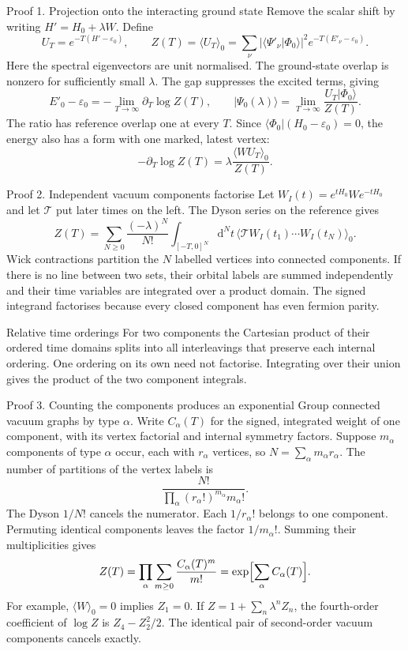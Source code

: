 \documentclass[aspectratio=169,10pt]{beamer}
\newcommand{\ket}[1]{\vert #1\rangle}
\newcommand{\bra}[1]{\langle #1\vert}
\newcommand{\braket}[2]{\langle #1\vert #2\rangle}
\newcommand{\dd}{\mathrm{d}}
\newcommand{\av}[1]{\langle #1\rangle_0}
\newcommand{\ph}{\Phi_0}
\begin{document}
\begin{frame}{Proof 1. Projection onto the interacting ground state}
Remove the scalar shift by writing $H'=H_0+\lambda W$. Define
\[
 U_T=e^{-T(H'-\varepsilon_0)},\qquad
 Z(T)=\av{U_T}=\sum_\nu |\braket{\Psi'_\nu}{\ph}|^2 e^{-T(E'_\nu-\varepsilon_0)}.
\]
Here the spectral eigenvectors are unit normalised. The ground-state overlap is nonzero for sufficiently small $\lambda$. The gap suppresses the excited terms, giving
\[
 E'_0-\varepsilon_0=-\lim_{T\to\infty}\partial_T\log Z(T),\qquad
 \ket{\Psi_0(\lambda)}=\lim_{T\to\infty}\frac{U_T\ket{\ph}}{Z(T)} .
\]
The ratio has reference overlap one at every $T$. Since
$\bra{\ph}(H_0-\varepsilon_0)=0$, the energy also has a form with one marked, latest vertex:
\[
 -\partial_T\log Z(T)=\lambda\frac{\av{W U_T}}{Z(T)} .
\]
\end{frame}

\begin{frame}{Proof 2. Independent vacuum components factorise}
Let $W_I(t)=e^{tH_0}W e^{-tH_0}$ and let $\mathcal T$ put later times on the left. The Dyson series on the reference gives
\[
 Z(T)=\sum_{N\ge0}\frac{(-\lambda)^N}{N!}
 \int_{[-T,0]^N}\!\dd^Nt\,
 \av{\mathcal T W_I(t_1)\cdots W_I(t_N)} .
\]
Wick contractions partition the $N$ labelled vertices into connected components. If there is no line between two sets, their orbital labels are summed independently and their time variables are integrated over a product domain. The signed integrand factorises because every closed component has even fermion parity.
\begin{block}{Relative time orderings}
For two components the Cartesian product of their ordered time domains splits into all interleavings that preserve each internal ordering. One ordering on its own need not factorise. Integrating over their union gives the product of the two component integrals.
\end{block}
\end{frame}

\begin{frame}{Proof 3. Counting the components produces an exponential}
Group connected vacuum graphs by type $\alpha$. Write $C_\alpha(T)$ for the signed, integrated weight of one component, with its vertex factorial and internal symmetry factors. Suppose $m_\alpha$ components of type $\alpha$ occur, each with $r_\alpha$ vertices, so $N=\sum_\alpha m_\alpha r_\alpha$. The number of partitions of the vertex labels is
\[
 \frac{N!}{\prod_\alpha (r_\alpha!)^{m_\alpha}m_\alpha!}.
\]
The Dyson $1/N!$ cancels the numerator. Each $1/r_\alpha!$ belongs to one component. Permuting identical components leaves the factor $1/m_\alpha!$. Summing their multiplicities gives
\[
 Z(T)=\prod_\alpha\sum_{m\ge0}\frac{C_\alpha(T)^m}{m!}
     =\exp\Bigl[\sum_\alpha C_\alpha(T)\Bigr].
\]
For example, $\av{W}=0$ implies $Z_1=0$. If $Z=1+\sum_n\lambda^n Z_n$, the fourth-order coefficient of $\log Z$ is $Z_4-Z_2^2/2$. The identical pair of second-order vacuum components cancels exactly.
\end{frame}
\end{document}
